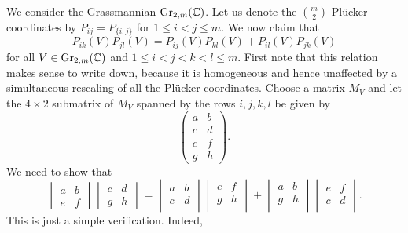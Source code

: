 \begin{example}

	We consider the Grassmannian $\operatorname{Gr}_{2, m}(\mathbb{C})$. Let us denote the $\binom{m}{2}$
	Plücker coordinates by $P_{ij} = P_{\{i,j\}}$ for $1 \leq i < j \leq m$. We now claim
	that
	\begin{equation*}
		P_{ik}(V)P_{jl}(V) = P_{ij}(V)P_{kl}(V) + P_{il}(V)P_{jk}(V)
	\end{equation*}
	for all $V \in \operatorname{Gr}_{2,m}(\mathbb{C})$ and $1 \leq i < j < k < l \leq m$. First note that this
	relation makes sense to write down, because it is homogeneous and hence unaffected by a
	simultaneous rescaling of all the Plücker coordinates. Choose a matrix $M_V$ and let
	the $4 \times 2$ submatrix of $M_V$ spanned by the rows $i,j,k,l$ be given by
	\begin{equation*}
		\begin{pmatrix}
			a & b \\
			c & d \\
			e & f \\
			g & h
		\end{pmatrix}.
	\end{equation*}
	We need to show that
	\begin{equation*}
		\begin{vmatrix}
			a & b \\
			e & f
		\end{vmatrix}
		\begin{vmatrix}
			c & d \\
			g & h
		\end{vmatrix}
		=
		\begin{vmatrix}
			a & b \\
			c & d \\
		\end{vmatrix}
		\begin{vmatrix}
			e & f \\
			g & h \\
		\end{vmatrix}
		+
		\begin{vmatrix}
			a & b \\
			g & h \\
		\end{vmatrix}
		\begin{vmatrix}
			e & f \\
			c & d \\
		\end{vmatrix}.
	\end{equation*}
	This is just a simple verification. Indeed,

\end{example}
